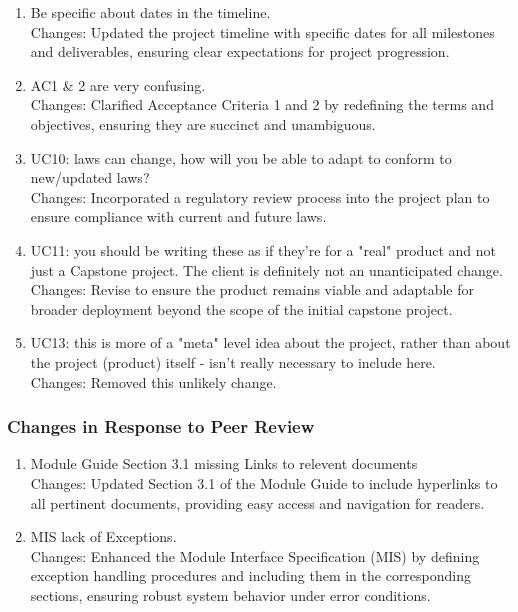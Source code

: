 \documentclass{article}
\begin{document}
\begin{enumerate}
        \item Be specific about dates in the timeline.\\
        Changes: Updated the project timeline with specific dates for 
                all milestones and deliverables, ensuring clear expectations for project progression.
        \item AC1 \& 2 are very confusing.\\
        Changes: Clarified Acceptance Criteria 1 and 2 by redefining the terms 
                and objectives, ensuring they are succinct and unambiguous.
        \item UC10: laws can change, how will you be able to adapt to conform to 
        new/updated laws?\\
        Changes: Incorporated a regulatory review process into the project plan to ensure compliance with current and future laws.
        \item UC11: you should be writing these as if they're for a "real" product 
        and not just a Capstone project. The client is definitely not an unanticipated change.\\
        Changes: Revise to ensure the product remains viable and adaptable for broader 
        deployment beyond the scope of the initial capstone project.
        \item UC13: this is more of a "meta" level idea about the project, rather 
        than about the project (product) itself - isn't really necessary to include here.\\
        Changes: Removed this unlikely change.
\end{enumerate}    

\subsubsection{Changes in Response to Peer Review}
\begin{enumerate}
        \item Module Guide Section 3.1 missing Links to relevent documents\\
        Changes: Updated Section 3.1 of the Module Guide to include hyperlinks to all pertinent documents, providing easy access and navigation for readers.
        \item MIS lack of Exceptions.\\
        Changes: Enhanced the Module Interface Specification (MIS) by defining exception handling procedures and including them in the corresponding sections, ensuring robust system behavior under error conditions.
\end{enumerate}    
\end{document}
